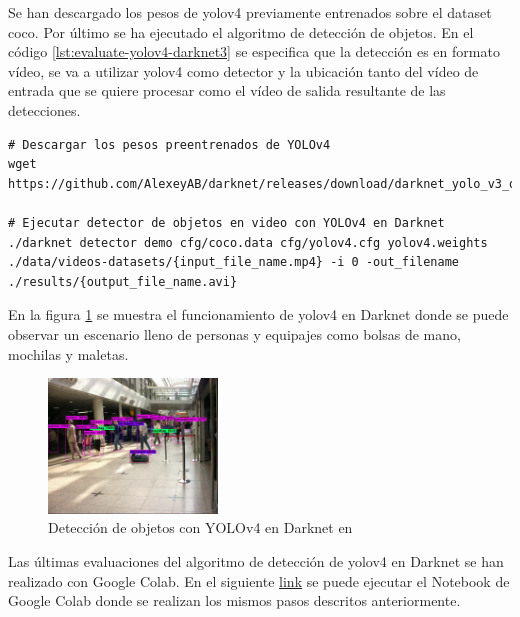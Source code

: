 Se han descargado los pesos de \gls{yolov4} previamente entrenados sobre el dataset \gls{coco}. Por último se ha ejecutado el algoritmo de detección de objetos. En el código \ref{lst:evaluate-yolov4-darknet3} se especifica que la detección es en formato vídeo, se va a utilizar \gls{yolov4} como detector y la ubicación tanto del vídeo de entrada que se quiere procesar como el vídeo de salida resultante de las detecciones.

\vspace{0.5cm}
\begin{lstlisting}[language=iPython,caption=Evaluación del detector de objetos YOLOv4 en Darknet (3),captionpos=b,label={lst:evaluate-yolov4-darknet3}]
# Descargar los pesos preentrenados de YOLOv4
wget https://github.com/AlexeyAB/darknet/releases/download/darknet_yolo_v3_optimal/yolov4.weights

# Ejecutar detector de objetos en video con YOLOv4 en Darknet
./darknet detector demo cfg/coco.data cfg/yolov4.cfg yolov4.weights ./data/videos-datasets/{input_file_name.mp4} -i 0 -out_filename ./results/{output_file_name.avi}
\end{lstlisting}

En la figura \ref{fig:detection-yolov4-darknet-pets2007} se muestra el funcionamiento de \gls{yolov4} en Darknet donde se puede observar un escenario lleno de personas y equipajes como bolsas de mano, mochilas y maletas.

\begin{figure}[ht]
\centering
\includegraphics[width=0.4\textwidth]{img/chapters/desarrollo/S08-fourthView-detection.jpg}
\caption{\label{fig:detection-yolov4-darknet-pets2007}Detección de objetos con YOLOv4 en Darknet en \cite{pets2007-dataset}}
\end{figure}

Las últimas evaluaciones del algoritmo de detección de \gls{yolov4} en Darknet se han realizado con Google Colab. En el siguiente \href{https://colab.research.google.com/drive/1kXcZL7iZ2sZmyFuQ6GwVFfkfyha6A6nr?usp=sharing}{link} se puede ejecutar el Notebook de Google Colab donde se realizan los mismos pasos descritos anteriormente.

